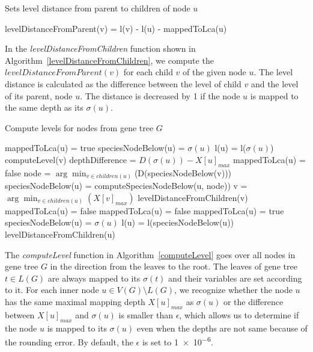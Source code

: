\begin{algorithm}[!htbp]
\caption{Sets level distance from parent to children of node $u$} 
\label{levelDistanceFromChildren}
\begin{algorithmic}[1]
		\State levelDistanceFromParent(v) = l(v) - l(u) - mappedToLca(u)
	\EndFor
\EndFunction
\end{algorithmic}
\end{algorithm}

In the \emph{levelDistanceFromChildren} function shown in Algorithm~\ref{levelDistanceFromChildren}, we compute the $levelDistanceFromParent(v)$ for each child $v$ of the given node $u$. The level distance is calculated as the difference between the level of child $v$ and the level of its parent, node $u$. The distance is decreased by 1 if the node $u$ is mapped to the same depth as its $\sigma(u)$.

\begin{algorithm}[!htbp]
\caption{Compute levels for nodes from gene tree $G$} 
\label{computeLevel}
\begin{algorithmic}[1]
		\State mappedToLca(u) = true
		\State speciesNodeBelow(u) = $\sigma(u)$
		\State l(u) = l($\sigma(u)$)
	\Else
			\State computeLevel(v)
		\EndFor
		\State depthDifference = $D(\sigma(u)) - X[u]_{max}$
			\State mappedToLca(u) = false
			\State node = $\arg \min_{v \in children(u)}$(D(speciesNodeBelow(v)))
			\State speciesNodeBelow(u) = computeSpeciesNodeBelow(u, node))
		\Else
					\State v = $\arg \min_{v \in children(u)}(X[v]_{max})$
					\State levelDistanceFromChildren(v)
				\EndIf
				\State mappedToLca(u) = false
				\State mappedToLca(u) = false
			\Else
				\State mappedToLca(u) = true
			\EndIf
			\State speciesNodeBelow(u) = $\sigma(u)$
		\EndIf
		\State l(u) = l(speciesNodeBelow(u))
		\State levelDistanceFromChildren(u)
	\EndIf
\EndFunction
\end{algorithmic}
\end{algorithm}

The \emph{computeLevel} function in Algorithm~\ref{computeLevel} goes over all nodes in gene tree $G$ in the direction from the leaves to the root. The leaves of gene tree $t \in L(G)$ are always mapped to its $\sigma(t)$ and their variables are set according to it. For each inner node $u \in V(G) \setminus L(G)$, we recognize whether the node $u$ has the same maximal mapping depth $X[u]_{max}$ as $\sigma(u)$ or the difference between $X[u]_{max}$ and $\sigma(u)$ is smaller than $\epsilon$, which allows us to determine if the node $u$ is mapped to its $\sigma(u)$ even when the depths are not same because of the rounding error. By default, the $\epsilon$ is set to \num{1e-6}.

